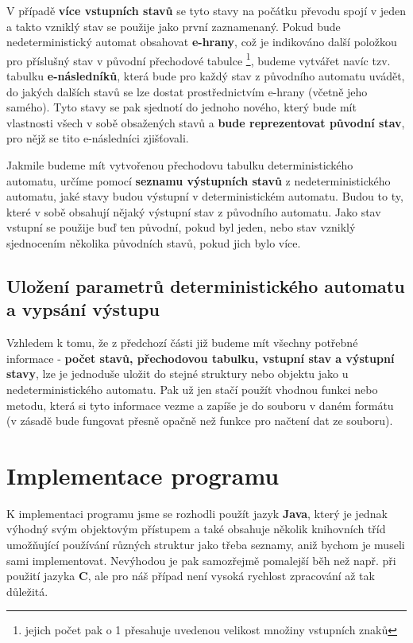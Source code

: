 \documentclass[11pt]{article}
\begin{document}
V případě \textbf{více vstupních stavů} se tyto stavy na počátku převodu spojí v jeden a takto vzniklý stav se použije jako první zaznamenaný. Pokud bude nedeterministický automat obsahovat \textbf{e-hrany}, což je indikováno další položkou pro příslušný stav v původní přechodové tabulce \footnote{jejich počet pak o 1 přesahuje uvedenou velikost množiny vstupních znaků}, budeme vytvářet navíc tzv. tabulku \textbf{e-následníků}, která bude pro každý stav z původního automatu uvádět, do jakých dalších stavů se lze dostat prostřednictvím e-hrany (včetně jeho samého). Tyto stavy se pak sjednotí do jednoho nového, který bude mít vlastnosti všech v sobě obsažených stavů a \textbf{bude reprezentovat původní stav}, pro nějž se tito e-následníci zjišťovali.

Jakmile budeme mít vytvořenou přechodovu tabulku deterministického automatu, určíme pomocí \textbf{seznamu výstupních stavů} z nedeterministického automatu, jaké stavy budou výstupní v deterministickém automatu. Budou to ty, které v sobě obsahují nějaký výstupní stav z původního automatu. Jako stav vstupní se použije buď ten původní, pokud byl jeden, nebo stav vzniklý sjednocením několika původních stavů, pokud jich bylo více.

\subsection{Uložení parametrů deterministického automatu a vypsání výstupu}
Vzhledem k tomu, že z předchozí části již budeme mít všechny potřebné informace - \textbf{počet stavů, přechodovou tabulku, vstupní stav a výstupní stavy}, lze je jednoduše uložit do stejné struktury nebo objektu jako u nedeterministického automatu. Pak už jen stačí použít vhodnou funkci nebo metodu, která si tyto informace vezme a zapíše je do souboru v daném formátu (v zásadě bude fungovat přesně opačně než funkce pro načtení dat ze souboru). 

\newpage

\section{Implementace programu}
K implementaci programu jsme se rozhodli použít jazyk \textbf{Java}, který je jednak výhodný svým objektovým přístupem a také obsahuje několik knihovních tříd umožňující používání různých struktur jako třeba seznamy, aniž bychom je museli sami implementovat. Nevýhodou je pak samozřejmě pomalejší běh než např. při použití jazyka \textbf{C}, ale pro náš případ není vysoká rychlost zpracování až tak důležitá.
\end{document}
